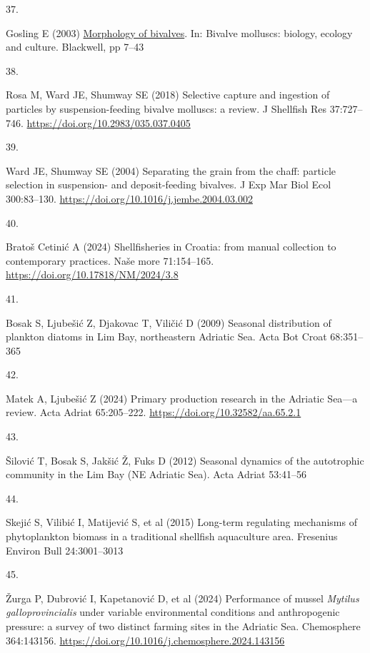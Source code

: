\documentclass[
  12 pt,
]{article}
\newlength{\cslhangindent}
\newlength{\csllabelwidth}
\newenvironment{CSLReferences}[2] %
 {\begin{list}{}{%
  \setlength{\itemindent}{0pt}
  \setlength{\leftmargin}{0pt}
  \setlength{\parsep}{0pt}
  \ifodd #1
   \setlength{\leftmargin}{\cslhangindent}
   \setlength{\itemindent}{-1\cslhangindent}
  \fi
  \setlength{\itemsep}{#2\baselineskip}}}
 {\end{list}}
\newcommand{\CSLLeftMargin}[1]{\parbox[t]{\csllabelwidth}{\strut#1\strut}}
\newcommand{\CSLRightInline}[1]{\parbox[t]{\linewidth - \csllabelwidth}{\strut#1\strut}}
\begin{document}
\begin{CSLReferences}{0}{0}
\CSLLeftMargin{37. }%
\CSLRightInline{Gosling E (2003) \href{https://doi.org/10.1002/9780470995532.ch2}{Morphology of bivalves}. In: Bivalve molluscs: biology, ecology and culture. Blackwell, pp 7--43}

\CSLLeftMargin{38. }%
\CSLRightInline{Rosa M, Ward JE, Shumway SE (2018) Selective capture and ingestion of particles by suspension-feeding bivalve molluscs: a review. J Shellfish Res 37:727--746. \url{https://doi.org/10.2983/035.037.0405}}

\CSLLeftMargin{39. }%
\CSLRightInline{Ward JE, Shumway SE (2004) Separating the grain from the chaff: particle selection in suspension- and deposit-feeding bivalves. J Exp Mar Biol Ecol 300:83--130. \url{https://doi.org/10.1016/j.jembe.2004.03.002}}

\CSLLeftMargin{40. }%
\CSLRightInline{Bratoš Cetinić A (2024) Shellfisheries in {Croatia}: from manual collection to contemporary practices. Naše more 71:154--165. \url{https://doi.org/10.17818/NM/2024/3.8}}

\CSLLeftMargin{41. }%
\CSLRightInline{Bosak S, Ljubešić Z, Djakovac T, Viličić D (2009) Seasonal distribution of plankton diatoms in {Lim Bay}, northeastern {Adriatic Sea}. Acta Bot Croat 68:351--365}

\CSLLeftMargin{42. }%
\CSLRightInline{Matek A, Ljubešić Z (2024) Primary production research in the {Adriatic Sea}---a review. Acta Adriat 65:205--222. \url{https://doi.org/10.32582/aa.65.2.1}}

\CSLLeftMargin{43. }%
\CSLRightInline{Šilović T, Bosak S, Jakšić Ž, Fuks D (2012) Seasonal dynamics of the autotrophic community in the {Lim Bay} ({NE Adriatic Sea}). Acta Adriat 53:41--56}

\CSLLeftMargin{44. }%
\CSLRightInline{Skejić S, Vilibić I, Matijević S, et al (2015) Long-term regulating mechanisms of phytoplankton biomass in a traditional shellfish aquaculture area. Fresenius Environ Bull 24:3001--3013}

\CSLLeftMargin{45. }%
\CSLRightInline{Žurga P, Dubrović I, Kapetanović D, et al (2024) Performance of mussel {{\emph{Mytilus}}}{{\emph{ galloprovincialis}}} under variable environmental conditions and anthropogenic pressure: a survey of two distinct farming sites in the {Adriatic Sea}. Chemosphere 364:143156. \url{https://doi.org/10.1016/j.chemosphere.2024.143156}}


\end{CSLReferences}
\end{document}
